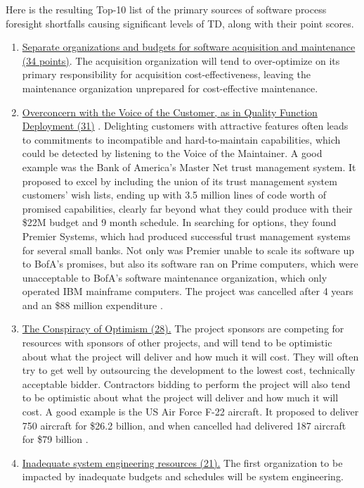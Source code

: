 Here is the resulting Top-10 list of the primary sources of software process foresight shortfalls causing significant levels of TD, along with their point scores.
\begin{enumerate}
	\item \ul{Separate organizations and budgets for software acquisition and maintenance (34 points)}.
	The acquisition organization will tend to over-optimize on its primary responsibility for acquisition cost-effectiveness, leaving the maintenance organization unprepared for cost-effective maintenance.
	\item \ul{Overconcern with the Voice of the Customer, as in Quality Function Deployment (31)} \cite{akao1994development}.
	Delighting customers with attractive features often leads to commitments to incompatible and hard-to-maintain capabilities, which could be detected by listening to the Voice of the Maintainer.
	A good example was the Bank of America's Master Net trust management system.
	It proposed to excel by including the union of its trust management system customers' wish lists, ending up with 3.5 million lines of code worth of promised capabilities, clearly far beyond what they could produce with their \$22M budget and 9 month schedule.
	In searching for options, they found Premier Systems, which had produced successful trust management systems for several small banks.
	Not only was Premier unable to scale its software up to BofA's promises, but also its software ran on Prime computers, which were unacceptable to BofA's software maintenance organization, which only operated IBM mainframe computers.
	The project was cancelled after 4 years and an \$88 million expenditure \cite{glass1997software}.
	\item \ul{The Conspiracy of Optimism (28).}
	The project sponsors are competing for resources with sponsors of other projects, and will tend to be optimistic about what the project will deliver and how much it will cost.
	They will often try to get well by outsourcing the development to the lowest cost, technically acceptable bidder.
	Contractors bidding to perform the project will also tend to be optimistic about what the project will deliver and how much it will cost.
	A good example is the US Air Force F-22 aircraft.
	It proposed to deliver 750 aircraft for \$26.2 billion, and when cancelled had delivered 187 aircraft for \$79 billion \cite{haffa2016learning}.
	\item \ul{Inadequate system engineering resources (21).}
	The first organization to be impacted by inadequate budgets and schedules will be system engineering.

\end{enumerate}
